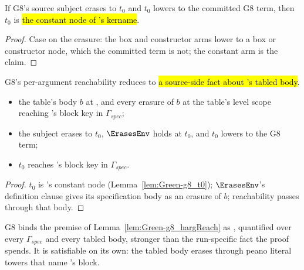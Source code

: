 \begin{lemma}\label{lem:Green-g8_t0}
 \leanok
{}
If G8's source subject erases to $t_0$ and $t_0$ lowers to the committed G8 term, then $t_0$ is
\hl{the constant node of 's kername}.
\end{lemma}

\begin{proof} \leanok
{}
 Case on the erasure: the box and constructor arms lower to a box or constructor node,
which the committed term is not; the constant arm is the claim.
\end{proof}

\begin{lemma}\label{lem:Green-g8_hargReach}
 \leanok
{}
 G8's per-argument reachability reduces to \hl{a source-side fact about
's tabled body}.
\begin{itemize}
\item {} the table's body $b$ at , and every erasure of $b$ at the table's
level scope reaching 's block key in $\Gamma_{spec}$;
\item the subject erases to $t_0$, $\ErasesEnv$ holds at $t_0$, and $t_0$ lowers to the G8 term;
\item {} $t_0$ reaches 's block key in $\Gamma_{spec}$.
\end{itemize}
\end{lemma}

\begin{proof} \leanok
{}
 $t_0$ is 's constant node (Lemma~\ref{lem:Green-g8_t0}); $\ErasesEnv$'s
definition clause gives its specification body as an erasure of $b$; reachability passes through
that body.
\end{proof}

\begin{remark}
 G8 binds the premise of Lemma~\ref{lem:Green-g8_hargReach} as ,
quantified over every $\Gamma_{spec}$ and every tabled body, stronger than the run-specific fact the
proof spends. It is satisfiable on its own: the tabled body erases through peano literal towers that
name 's block.
\end{remark}


